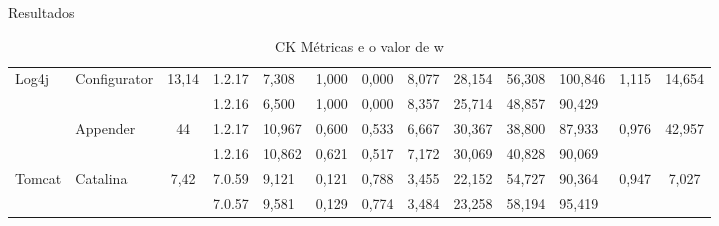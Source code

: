 \documentclass[t,14pt,mathserif]{beamer}
\begin{document}
\begin{frame}{Resultados}
\begin{table}[h]
{\begin{tabular}{|l|l|c|l|l|l|l|l|l|l|l|c|c|}
\multirow{4}{*}{Log4j}                     & \multirow{2}{*}{Configurator}         & \multirow{2}{*}{13,14}     & 1.2.17                            & 7,308                          & 1,000                          & 0,000                          & 8,077                          & 28,154                         & 56,308                          & 100,846                         & \multirow{2}{*}{1,115} & \multirow{2}{*}{14,654} \\ \cline{4-11}
                                           &                                       &                            & 1.2.16                            & 6,500                          & 1,000                          & 0,000                          & 8,357                          & 25,714                         & 48,857                          & 90,429                          &                        &                         \\ \cline{2-13} 
                                           & \multirow{2}{*}{Appender}             & \multirow{2}{*}{44}        & 1.2.17                            & 10,967                         & 0,600                          & 0,533                          & 6,667                          & 30,367                         & 38,800                          & 87,933                          & \multirow{2}{*}{0,976} & \multirow{2}{*}{42,957} \\ \cline{4-11}
                                           &                                       &                            & 1.2.16                            & 10,862                         & 0,621                          & 0,517                          & 7,172                          & 30,069                         & 40,828                          & 90,069                          &                        &                         \\ \hline
\multirow{2}{*}{Tomcat}                    & \multirow{2}{*}{Catalina}             & \multirow{2}{*}{7,42}      & 7.0.59                            & 9,121                          & 0,121                          & 0,788                          & 3,455                          & 22,152                         & 54,727                          & 90,364                          & \multirow{2}{*}{0,947} & \multirow{2}{*}{7,027}  \\ \cline{4-11}
                                           &                                       &                            & 7.0.57                            & 9,581                          & 0,129                          & 0,774                          & 3,484                          & 23,258                         & 58,194                          & 95,419                          &                        &                         \\ \hline
\end{tabular}
}
\caption{CK Métricas e o valor de w}
\label{tab:ck_metricas}
\end{table}

	


\end{frame}
\end{document}
